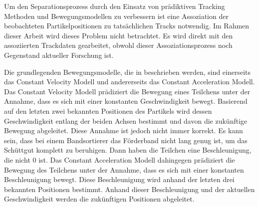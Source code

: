 Um den Separationsprozess durch den Einsatz von prädiktiven Tracking Methoden und Bewegungsmodellen zu verbessern ist eine Assoziation 
der beobachteten Partikelpositionen zu tatsächlichen Tracks notwendig. 
Im Rahmen dieser Arbeit wird dieses Problem nicht betrachtet. 
Es wird direkt mit den assoziierten Trackdaten gearbeitet, 
obwohl dieser Assoziationsprozess noch Gegenstand aktueller Forschung ist.

Die grundlegenden Bewegungsmodelle, die in \cite{Pfaff2018} beschrieben werden,
sind einerseits das Constant Velocity Modell und andererseits das Constant Acceleration Modell.
Das Constant Velocity Modell prädiziert die Bewegung eines Teilchens unter der Annahme, dass es sich mit einer konstanten Geschwindigkeit bewegt.
Basierend auf den letzten zwei bekannten Positionen des Partikels wird dessen Geschwindigkeit entlang der beiden Achsen bestimmt 
und davon die zukünftige Bewegung abgeleitet.
Diese Annahme ist jedoch nicht immer korrekt.
Es kann sein, dass bei einem Bandsortierer das Förderband nicht lang genug ist, um das Schüttgut komplett zu beruhigen.
Dann haben die Teilchen eine Beschleunigung, die nicht 0 ist.
Das Constant Acceleration Modell dahingegen prädiziert die Bewegung des Teilchens unter der Annahme, dass es sich mit einer konstanten Beschleunigung bewegt.
Diese Beschleunigung wird anhand der letzten drei bekannten Positionen bestimmt.
Anhand dieser Beschleunigung und der aktuellen Geschwindigkeit werden die zukünftigen Positionen abgeleitet.


